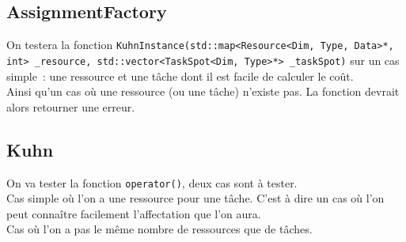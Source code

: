 


\subsection{AssignmentFactory}

On testera la fonction \texttt{KuhnInstance(std::map<Resource<Dim, Type, Data>*, int> \_resource, std::vector<TaskSpot<Dim, Type>*> \_taskSpot)} sur un cas simple~: une ressource et une tâche dont il est facile de calculer le coût.\\
Ainsi qu'un cas où une ressource (ou une tâche) n'existe pas. La fonction devrait alors retourner une erreur.

\subsection{Kuhn}

On va tester la fonction \texttt{operator()}, deux cas sont à tester.\\
Cas simple où l'on a une ressource pour une tâche. C'est à dire un cas où l'on peut connaître facilement l'affectation que l'on aura.\\
Cas où l'on a pas le même nombre de ressources que de tâches.
